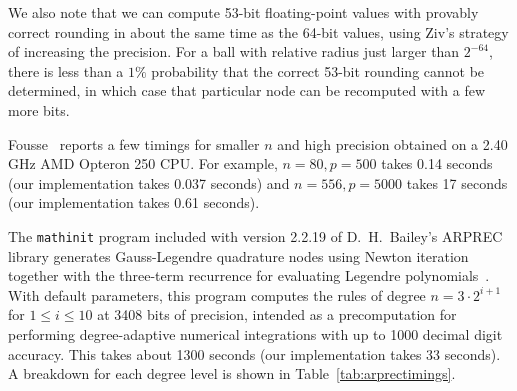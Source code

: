 \documentclass{siamart0216}
\begin{document}
We also note that we can compute 53-bit floating-point values
with provably correct rounding in about the same time as the 64-bit
values, using Ziv's strategy of increasing the precision.
For a ball with relative radius just larger than $2^{-64}$, there
is less than a $1\%$ probability that the correct 53-bit rounding
cannot be determined, in which case that particular node
can be recomputed with a few more bits.

Fousse~\cite{fousse2007accurate} reports a few timings for smaller $n$ and high precision
obtained on a 2.40 GHz AMD Opteron 250 CPU.
For example, $n = 80, p = 500$ takes 0.14 seconds (our implementation
takes 0.037 seconds) and $n = 556, p = 5000$ takes 17 seconds
(our implementation takes 0.61 seconds).

The \texttt{mathinit} program included with version 2.2.19
of D.\ H.\ Bailey's ARPREC library
generates Gauss-Legendre quadrature nodes
using Newton iteration together with the three-term recurrence for evaluating
Legendre polynomials~\cite{bailey2002arprec,bailey2011high}.
With default parameters, this program computes the rules of degree $n = 3 \cdot 2^{i+1}$
for $1 \le i \le 10$ at 3408 bits of precision, intended as
a precomputation for performing
degree-adaptive numerical integrations with up to 1000 decimal digit accuracy.
This takes about 1300 seconds (our implementation takes 33 seconds).
A breakdown for each degree level
is shown in Table~\ref{tab:arprectimings}.
\end{document}
